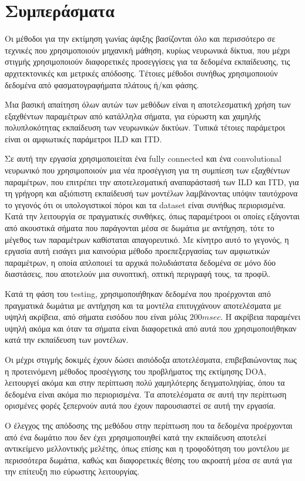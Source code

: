 
\chapter{Συμπεράσματα}

Οι μέθοδοι για την εκτίμηση γωνίας άφιξης βασίζονται όλο και περισσότερο σε τεχνικές που χρησιμοποιούν μηχανική μάθηση, κυρίως νευρωνικά δίκτυα, που μέχρι στιγμής χρησιμοποιούν διαφορετικές προσεγγίσεις για τα δεδομένα εκπαίδευσης, τις αρχιτεκτονικές και μετρικές απόδοσης. Τέτοιες μέθοδοι συνήθως χρησιμοποιούν δεδομένα από φασματογραφήματα πλάτους ή/και φάσης.

Μια βασική απαίτηση όλων αυτών των μεθόδων είναι η αποτελεσματική χρήση των εξαχθέντων παραμέτρων από κατάλληλα σήματα, για εύρωστη και χαμηλής πολυπλοκότητας εκπαίδευση των νευρωνικών δικτύων. Τυπικά τέτοιες παράμετροι είναι οι αμφιωτικές παράμετροι ILD και ITD.

Σε αυτή την εργασία χρησιμοποιείται ένα fully connected και ένα convolutional νευρωνικό που χρησιμοποιούν μια νέα προσέγγιση για τη συμπίεση των εξαχθέντων παραμέτρων, που επιτρέπει την αποτελεσματική αναπαράστασή των ILD και ITD, για τη γρήγορη και αξιόπιστη εκπαίδευσή των μοντέλων λαμβάνοντας υπόψιν ταυτόχρονα το γεγονός ότι οι υπολογιστικοί πόροι και τα dataset είναι συνήθως περιορισμένα. Κατά την λειτουργία σε πραγματικές συνθήκες, όπως παραμέτροοι οι οποίες εξάγονται από ακουστικά σήματα που παράγονται μέσα σε δωμάτια με αντήχηση, τότε το μέγεθος των παραμέτρων καθίσταται απαγορευτικό. Με κίνητρο αυτό το γεγονός, η εργασία αυτή εισάγει μια καινούρια μέθοδο προεπεξεργασίας των αμφιωτικών παραμέτρων, η οποία απλοποιεί τα αρχικά πολυδιάστατα δεδομένα σε μόνο δύο διαστάσεις, που αποτελούν μια συνοπτική, οπτική περιγραφή τους, τα προφίλ.

Κατά τη φάση του testing, χρησιμοποιήθηκαν δεδομένα που προέρχονται από πραγματικά δωμάτια με αντήχηση και τα μοντέλα επιτυγχάνουν αποτελέσματα με υψηλή ακρίβεια, από σήματα εισόδου που είναι μόλις $200msec$. Η ακρίβεια παραμένει υψηλή ακόμα και όταν τα σήματα είναι διαφορετικά από αυτά που χρησιμοποιήθηκαν κατά την εκπαίδευση των μοντέλων.

Οι μέχρι στιγμής δοκιμές έχουν δώσει αισιόδοξα αποτελέσματα, επιβεβαιώνοντας πως η προτεινόμενη μέθοδος προσέγγισης του προβλήματος της εκτίμησης DOA, λειτουργεί ακόμα και στην περίπτωση πολύ χαμηλότερης δειγματοληψίας, όπου τα δεδομένα είναι ακόμα πιο περιορισμένα. Τα αποτελέσματα σε αυτή την περίπτωση ορισμένες φορές ξεπερνούν αυτά που έχουν παρουσιαστεί σε αυτή την εργασία.

Ο έλεγχος της απόδοσης της μεθόδου στην περίπτωση που τα δεδομένα προέρχονται από ένα δωμάτιο που δεν έχει χρησιμοποιηθεί κατά την εκπαίδευση αποτελεί αντικείμενο μελλοντικής μελέτης, όπως επίσης και η τροφοδότηση του μοντέλου με περισσότερα δωμάτια, καθώς και διαφορετικές θέσης του ακροατή μέσα σε αυτά για την επίτευξη πιο εύρωστης λειτουργίας.